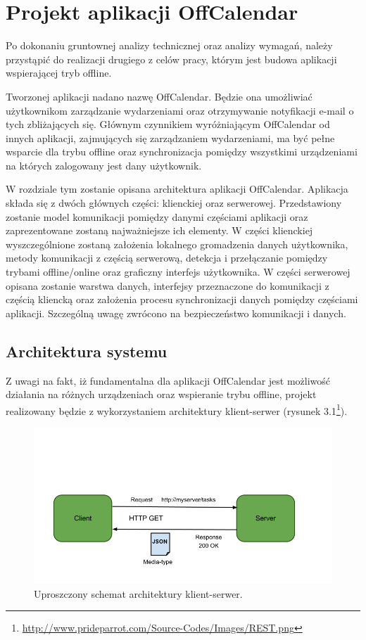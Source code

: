 \chapter{Projekt aplikacji OffCalendar}
\label{cha:proAppOff}

Po dokonaniu gruntownej analizy technicznej oraz analizy wymagań, należy przystąpić do realizacji drugiego z celów pracy, którym jest budowa aplikacji wspierającej tryb offline.

Tworzonej aplikacji nadano nazwę OffCalendar. Będzie ona umożliwiać użytkownikom zarządzanie wydarzeniami oraz otrzymywanie notyfikacji e-mail o tych zbliżających się. Głównym czynnikiem wyróżniającym OffCalendar od innych aplikacji, zajmujących się zarządzaniem wydarzeniami, ma być pełne wsparcie dla trybu offline oraz synchronizacja pomiędzy wszystkimi urządzeniami na których zalogowany jest dany użytkownik.

W rozdziale tym zostanie opisana architektura aplikacji OffCalendar. Aplikacja składa się z dwóch głównych części: klienckiej oraz serwerowej. Przedstawiony zostanie model komunikacji pomiędzy danymi częściami aplikacji oraz zaprezentowane zostaną najważniejsze ich elementy. W części klienckiej wyszczególnione zostaną założenia lokalnego gromadzenia danych użytkownika, metody komunikacji z częścią serwerową, detekcja i przełączanie pomiędzy trybami offline/online oraz graficzny interfejs użytkownika. W części serwerowej opisana zostanie warstwa danych, interfejsy przeznaczone do komunikacji z częścią kliencką oraz założenia procesu synchronizacji danych pomiędzy częściami aplikacji. Szczególną uwagę zwrócono na bezpieczeństwo komunikacji i danych.

\section{Architektura systemu}
\label{sec:archSys}

Z uwagi na fakt, iż fundamentalna dla aplikacji OffCalendar jest możliwość działania na różnych urządzeniach oraz wspieranie trybu offline, projekt realizowany będzie z wykorzystaniem architektury klient-serwer (rysunek 3.1\footnote{\url{http://www.prideparrot.com/Source-Codes/Images/REST.png}}).

\begin{figure}[H]
\centering
\includegraphics[width=1.0\textwidth]{architecture.png}
\caption{Uproszczony schemat architektury klient-serwer.}
\end{figure}

